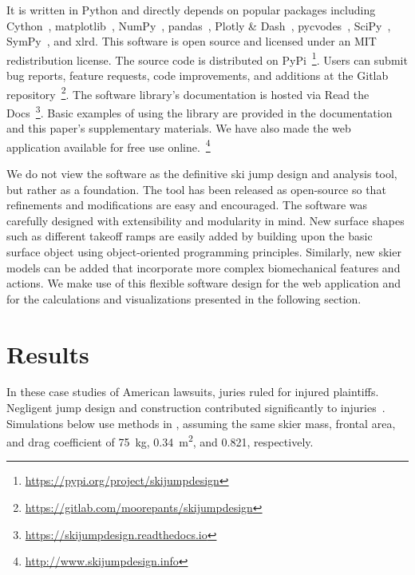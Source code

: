 \documentclass[smallextended]{svjour3}       %
\begin{document}
It is written in Python and directly depends on popular packages including
Cython~\cite{Behnel2011}, matplotlib~\cite{Hunter2007},
NumPy~\cite{Oliphant2006}, pandas~\cite{McKinney2020}, Plotly \&
Dash~\cite{Plotly2015}, pycvodes~\cite{Dahlgren2018},
SciPy~\cite{Virtanen2020}, SymPy~\cite{Meurer2017}, and xlrd. This software is
open source and licensed under an MIT redistribution license. The source code
is distributed on PyPi~\footnote{\url{https://pypi.org/project/skijumpdesign}}.
Users can submit bug reports, feature requests, code improvements, and
additions at the Gitlab
repository~\footnote{\url{https://gitlab.com/moorepants/skijumpdesign}}. The
software library's documentation is hosted via Read the
Docs~\footnote{\url{https://skijumpdesign.readthedocs.io}}.  Basic examples of
using the library are provided in the documentation and this paper's
supplementary materials. We have also made the web application available for
free use online.~\footnote{ \url{http://www.skijumpdesign.info}}

We do not view the software as the definitive ski jump design and analysis
tool, but rather as a foundation. The tool has been released as open-source so
that refinements and modifications are easy and encouraged. The software was
carefully designed with extensibility and modularity in mind. New surface
shapes such as different takeoff ramps are easily added by building upon the
basic surface object using object-oriented programming principles. Similarly,
new skier models can be added that incorporate more complex biomechanical
features and actions. We make use of this flexible software design for the web
application and for the calculations and visualizations presented in the
following section.

\section{Results}
\label{sec:case}
%
In these case studies of American lawsuits, juries ruled for injured
plaintiffs. Negligent jump design and construction contributed significantly to
injuries~\cite{SuperiorCourtSanFranciscoCounty2002,KingCountySuperiorCourt2008}.
Simulations below use methods in \cite{Levy2015}, assuming the same skier mass,
frontal area, and drag coefficient of 75~\si{\kg}, 0.34~\si{\meter\squared},
and 0.821, respectively.
\end{document}
